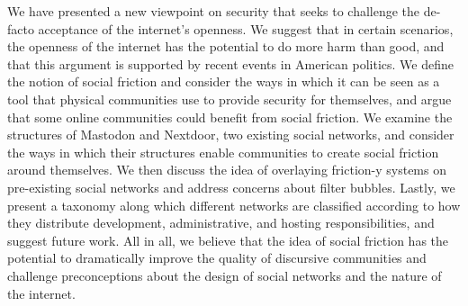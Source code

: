 \documentclass[sigconf,authordraft]{acmart}
\begin{document}
We have presented a new viewpoint on security that seeks to challenge the de-facto acceptance of the internet's openness. We suggest that in certain scenarios, the openness of the internet has the potential to do more harm than good, and that this argument is supported by recent events in American politics. We define the notion of social friction and consider the ways in which it can be seen as a tool that physical communities use to provide security for themselves, and argue that some online communities could benefit from social friction. We examine the structures of Mastodon and Nextdoor, two existing social networks, and consider the ways in which their structures enable communities to create social friction around themselves. We then discuss the idea of overlaying friction-y systems on pre-existing social networks and address concerns about filter bubbles. Lastly, we present a taxonomy along which different networks are classified according to how they distribute development, administrative, and hosting responsibilities, and suggest future work. All in all, we believe that the idea of social friction has the potential to dramatically improve the quality of discursive communities and challenge preconceptions about the design of social networks and the nature of the internet. 





\end{document}
